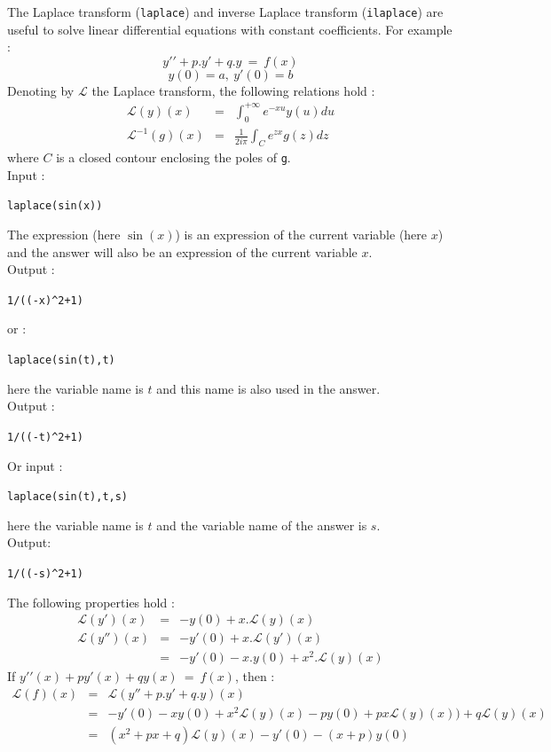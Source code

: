 \documentclass[a4paper,11pt]{book}
\begin{document}
The Laplace transform ({\tt laplace}) and inverse Laplace transform
({\tt ilaplace}) are useful to solve linear differential equations
with constant coefficients. For example :
$$y \prime \prime +p. y \prime+q. y \ =\ f(x)$$ $$ y(0)=a, \ y\prime(0)=b$$
Denoting by ${\mathcal{L}}$ the Laplace transform,
the following relations hold :
\begin{eqnarray*}
{\mathcal{L}}(y)(x)&=&\int_0^{+\infty}e^{-x u}y(u)du \\
{\mathcal{L}}^{-1}(g)(x)&=&\frac{1}{2i\pi}\int_C e^{z x}g(z)dz
\end{eqnarray*}
where $C$ is a closed contour enclosing the poles of {\tt g}.\\
Input :
\begin{center}{\tt laplace(sin(x))}\end{center}
The expression (here $\sin(x)$) is an expression of the current variable 
(here $x$) and the answer will also be an expression of the current variable 
$x$.\\
Output :
\begin{center}{\tt 1/((-x)\verb|^|2+1)}\end{center}
or :
\begin{center}{\tt laplace(sin(t),t)}\end{center}
here the variable name is $t$ and this name is also used in the answer.\\
Output :
\begin{center}{\tt 1/((-t)\verb|^|2+1)}\end{center}
Or input :
\begin{center}{\tt laplace(sin(t),t,s)}\end{center}
here the variable name is $t$ and the variable name of the answer is $s$.\\
Output:
\begin{center}{\tt 1/((-s)\verb|^|2+1)}\end{center}
The following properties hold :
\begin{eqnarray*}
{\mathcal{L}}(y')(x) &=&-y(0)+x.{\mathcal{L}}(y)(x) \\
{\mathcal{L}}(y'')(x) &=&-y'(0)+x.{\mathcal{L}}(y')(x) \\
 &=& -y'(0)-x.y(0)+x^2.{\mathcal{L}}(y)(x)
\end{eqnarray*}
If $y \prime \prime(x) +p y \prime(x)+q y(x) \ =\ f(x)$, then :
\begin{eqnarray*}
{\mathcal{L}}(f)(x) &=&{\mathcal{L}}(y''+p.y'+q.y)(x) \\
&=& -y'(0)-x y(0)+x^2 {\mathcal{L}}(y)(x)-p y(0)+p x {\mathcal{L}}(y)(x))+q {\mathcal{L}}(y)(x) \\
&=& (x^2+p x+q) {\mathcal{L}}(y)(x)-y'(0)-(x+p) y(0)
\end{eqnarray*}
\end{document}
